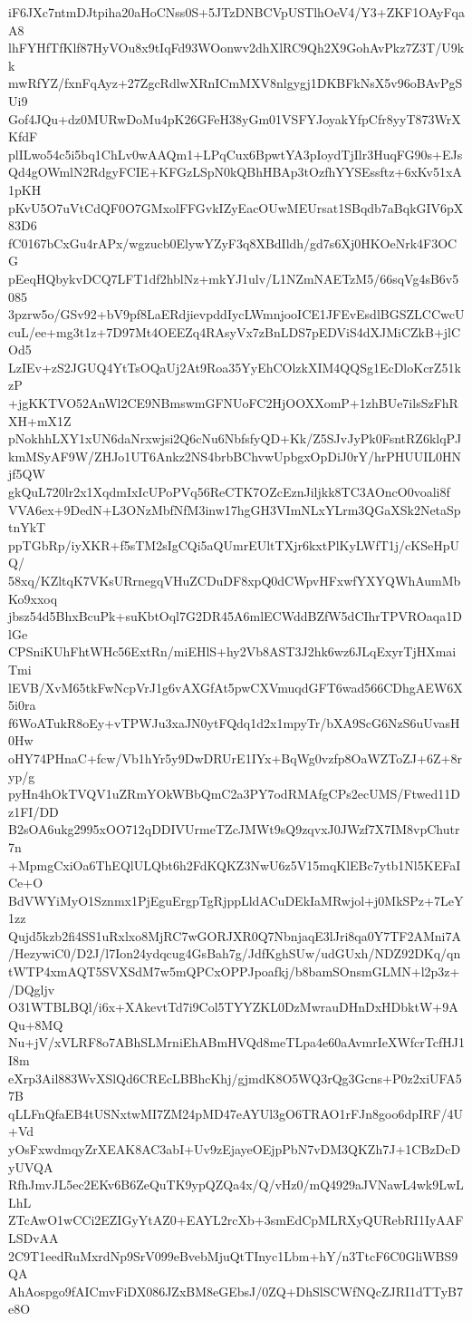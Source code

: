 iF6JXc7ntmDJtpiha20aHoCNss0S+5JTzDNBCVpUSTlhOeV4/Y3+ZKF1OAyFqaA8
lhFYHfTfKlf87HyVOu8x9tIqFd93WOonwv2dhXlRC9Qh2X9GohAvPkz7Z3T/U9kk
mwRfYZ/fxnFqAyz+27ZgcRdlwXRnICmMXV8nlgygj1DKBFkNsX5v96oBAvPgSUi9
Gof4JQu+dz0MURwDoMu4pK26GFeH38yGm01VSFYJoyakYfpCfr8yyT873WrXKfdF
plILwo54c5i5bq1ChLv0wAAQm1+LPqCux6BpwtYA3pIoydTjIlr3HuqFG90s+EJs
Qd4gOWmlN2RdgyFCIE+KFGzLSpN0kQBhHBAp3tOzfhYYSEssftz+6xKv51xA1pKH
pKvU5O7uVtCdQF0O7GMxolFFGvkIZyEacOUwMEUrsat1SBqdb7aBqkGIV6pX83D6
fC0167bCxGu4rAPx/wgzucb0ElywYZyF3q8XBdIldh/gd7s6Xj0HKOeNrk4F3OCG
pEeqHQbykvDCQ7LFT1df2hblNz+mkYJ1ulv/L1NZmNAETzM5/66sqVg4sB6v5085
3pzrw5o/GSv92+bV9pf8LaERdjievpddIycLWmnjooICE1JFEvEsdlBGSZLCCwcU
cuL/ee+mg3t1z+7D97Mt4OEEZq4RAsyVx7zBnLDS7pEDViS4dXJMiCZkB+jlCOd5
LzIEv+zS2JGUQ4YtTsOQaUj2At9Roa35YyEhCOlzkXIM4QQSg1EcDloKcrZ51kzP
+jgKKTVO52AnWl2CE9NBmswmGFNUoFC2HjOOXXomP+1zhBUe7ilsSzFhRXH+mX1Z
pNokhhLXY1xUN6daNrxwjsi2Q6cNu6NbfsfyQD+Kk/Z5SJvJyPk0FsntRZ6klqPJ
kmMSyAF9W/ZHJo1UT6Ankz2NS4brbBChvwUpbgxOpDiJ0rY/hrPHUUIL0HNjf5QW
gkQuL720lr2x1XqdmIxIcUPoPVq56ReCTK7OZcEznJiljkk8TC3AOncO0voali8f
VVA6ex+9DedN+L3ONzMbfNfM3inw17hgGH3VImNLxYLrm3QGaXSk2NetaSptnYkT
ppTGbRp/iyXKR+f5sTM2sIgCQi5aQUmrEUltTXjr6kxtPlKyLWfT1j/cKSeHpUQ/
58xq/KZltqK7VKsURrnegqVHuZCDuDF8xpQ0dCWpvHFxwfYXYQWhAumMbKo9xxoq
jbsz54d5BhxBcuPk+suKbtOql7G2DR45A6mlECWddBZfW5dCIhrTPVROaqa1DlGe
CPSniKUhFhtWHc56ExtRn/miEHlS+hy2Vb8AST3J2hk6wz6JLqExyrTjHXmaiTmi
lEVB/XvM65tkFwNcpVrJ1g6vAXGfAt5pwCXVmuqdGFT6wad566CDhgAEW6X5i0ra
f6WoATukR8oEy+vTPWJu3xaJN0ytFQdq1d2x1mpyTr/bXA9ScG6NzS6uUvasH0Hw
oHY74PHnaC+fcw/Vb1hYr5y9DwDRUrE1IYx+BqWg0vzfp8OaWZToZJ+6Z+8ryp/g
pyHn4hOkTVQV1uZRmYOkWBbQmC2a3PY7odRMAfgCPs2ecUMS/Ftwed11Dz1FI/DD
B2sOA6ukg2995xOO712qDDIVUrmeTZcJMWt9sQ9zqvxJ0JWzf7X7IM8vpChutr7n
+MpmgCxiOa6ThEQlULQbt6h2FdKQKZ3NwU6z5V15mqKlEBc7ytb1Nl5KEFaICe+O
BdVWYiMyO1Sznmx1PjEguErgpTgRjppLldACuDEkIaMRwjol+j0MkSPz+7LeY1zz
Qujd5kzb2fi4SS1uRxlxo8MjRC7wGORJXR0Q7NbnjaqE3lJri8qa0Y7TF2AMni7A
/HezywiC0/D2J/l7Ion24ydqcug4GsBah7g/JdfKghSUw/udGUxh/NDZ92DKq/qn
tWTP4xmAQT5SVXSdM7w5mQPCxOPPJpoafkj/b8bamSOnsmGLMN+l2p3z+/DQgljv
O31WTBLBQl/i6x+XAkevtTd7i9Col5TYYZKL0DzMwrauDHnDxHDbktW+9AQu+8MQ
Nu+jV/xVLRF8o7ABhSLMrniEhABmHVQd8meTLpa4e60aAvmrIeXWfcrTcfHJ1I8m
eXrp3Ail883WvXSlQd6CREcLBBhcKhj/gjmdK8O5WQ3rQg3Gcns+P0z2xiUFA57B
qLLFnQfaEB4tUSNxtwMI7ZM24pMD47eAYUl3gO6TRAO1rFJn8goo6dpIRF/4U+Vd
yOsFxwdmqyZrXEAK8AC3abI+Uv9zEjayeOEjpPbN7vDM3QKZh7J+1CBzDcDyUVQA
RfhJmvJL5ec2EKv6B6ZeQuTK9ypQZQa4x/Q/vHz0/mQ4929aJVNawL4wk9LwLLhL
ZTcAwO1wCCi2EZIGyYtAZ0+EAYL2rcXb+3smEdCpMLRXyQURebRI1IyAAFLSDvAA
2C9T1eedRuMxrdNp9SrV099eBvebMjuQtTInyc1Lbm+hY/n3TtcF6C0GliWBS9QA
AhAospgo9fAICmvFiDX086JZxBM8eGEbsJ/0ZQ+DhSlSCWfNQcZJRI1dTTyB7e8O
